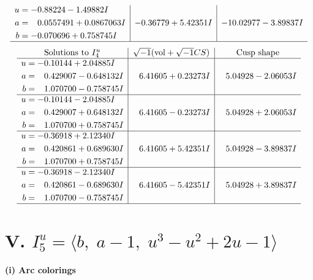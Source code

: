 \documentclass[1p]{elsarticle_modified}
\theoremstyle{definition}
\newcommand{\I}{\sqrt{-1}}
\begin{document}
$$\begin{array}{c|c|c}
\begin{aligned}
u &= -0.88224 - 1.49882 I \\
a &= \phantom{-}0.0557491 + 0.0867063 I \\
b &= -0.070696 + 0.758745 I\end{aligned}
 & -0.36779 + 5.42351 I & -10.02977 - 3.89837 I\\
 \hline 
 \end{array}$$\newpage$$\begin{array}{c|c|c}  
\text{Solutions to }I^u_{4}& \I (\text{vol} + \sqrt{-1}CS) & \text{Cusp shape}\\
 \hline 
\begin{aligned}
u &= -0.10144 + 2.04885 I \\
a &= \phantom{-}0.429007 - 0.648132 I \\
b &= \phantom{-}1.070700 - 0.758745 I\end{aligned}
 & \phantom{-}6.41605 + 0.23273 I & \phantom{-}5.04928 - 2.06053 I \\ \hline\begin{aligned}
u &= -0.10144 - 2.04885 I \\
a &= \phantom{-}0.429007 + 0.648132 I \\
b &= \phantom{-}1.070700 + 0.758745 I\end{aligned}
 & \phantom{-}6.41605 - 0.23273 I & \phantom{-}5.04928 + 2.06053 I \\ \hline\begin{aligned}
u &= -0.36918 + 2.12340 I \\
a &= \phantom{-}0.420861 + 0.689630 I \\
b &= \phantom{-}1.070700 + 0.758745 I\end{aligned}
 & \phantom{-}6.41605 + 5.42351 I & \phantom{-}5.04928 - 3.89837 I \\ \hline\begin{aligned}
u &= -0.36918 - 2.12340 I \\
a &= \phantom{-}0.420861 - 0.689630 I \\
b &= \phantom{-}1.070700 - 0.758745 I\end{aligned}
 & \phantom{-}6.41605 - 5.42351 I & \phantom{-}5.04928 + 3.89837 I\\
 \hline 
 \end{array}$$\newpage\newpage\renewcommand{\arraystretch}{1}
\centering \section*{V. $I^u_{5}= \langle b,\;a-1,\;u^3- u^2+2 u-1 \rangle$}
\flushleft \textbf{(i) Arc colorings}\\
\end{document}
